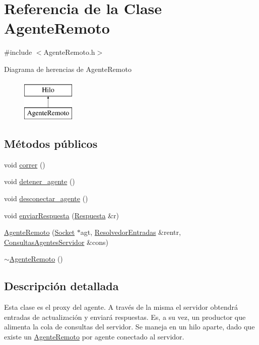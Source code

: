 \hypertarget{classAgenteRemoto}{\section{\-Referencia de la \-Clase \-Agente\-Remoto}
\label{classAgenteRemoto}
}


{\ttfamily \#include $<$\-Agente\-Remoto.\-h$>$}

\-Diagrama de herencias de \-Agente\-Remoto\begin{figure}[H]
\begin{center}
\leavevmode
\includegraphics[height=2.000000cm]{classAgenteRemoto}
\end{center}
\end{figure}
\subsection*{\-Métodos públicos}
\begin{DoxyCompactItemize}
\item 
void \hyperlink{classAgenteRemoto_a197fde39c6ee189d9527ac6668d544de}{correr} ()
\item 
void \hyperlink{classAgenteRemoto_ac51c7c596b2e84c9a2881c6e2c0cc345}{detener\-\_\-agente} ()
\item 
void \hyperlink{classAgenteRemoto_a00c67ba1508af5e5ce370c2122fca410}{desconectar\-\_\-agente} ()
\item 
void \hyperlink{classAgenteRemoto_aad964a1ec6c3cac32191e803bc4b4b84}{enviar\-Respuesta} (\hyperlink{classRespuesta}{\-Respuesta} \&r)
\item 
\hyperlink{classAgenteRemoto_a367ab6b1b611c2135e96f9af22697d1b}{\-Agente\-Remoto} (\hyperlink{classSocket}{\-Socket} $\ast$agt, \hyperlink{classResolvedorEntradas}{\-Resolvedor\-Entradas} \&rentr, \hyperlink{classBLQueue}{\-Consultas\-Agentes\-Servidor} \&cons)
\item 
\hyperlink{classAgenteRemoto_a2f741f99a64eaab6094b592b78dfc22d}{$\sim$\-Agente\-Remoto} ()
\end{DoxyCompactItemize}


\subsection{\-Descripción detallada}
\-Esta clase es el proxy del agente. \-A través de la misma el servidor obtendrá entradas de actualización y enviará respuestas. \-Es, a su vez, un productor que alimenta la cola de consultas del servidor. \-Se maneja en un hilo aparte, dado que existe un \hyperlink{classAgenteRemoto}{\-Agente\-Remoto} por agente conectado al servidor. 

